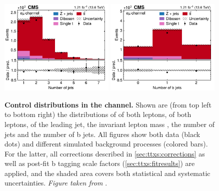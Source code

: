 \begin{figure}[!hp]
\includegraphics[width=0.49\textwidth]{figures/ttxs/njet_em.pdf}
\hfill
\includegraphics[width=0.49\textwidth]{figures/ttxs/nbtag_em.pdf}
\caption{
    \textbf{Control distributions in the \emu channel.} Shown are (from top left to bottom right) the distributions of \pt of both leptons, \abseta of both leptons, \pt of the leading jet, the invariant lepton mass \mll, the number of jets and the number of b jets. All figures show both data (black dots) and different simulated background processes (colored bars). For the latter, all corrections described in \cref{sec:ttxs:corrections} as well as post-fit b tagging scale factors (\cref{sec:ttxs:fitresults}) are applied, and the shaded area covers both statistical and systematic uncertainties. \textit{Figure taken from }.
}
\label{fig:ttxs:control_em}
\end{figure}

